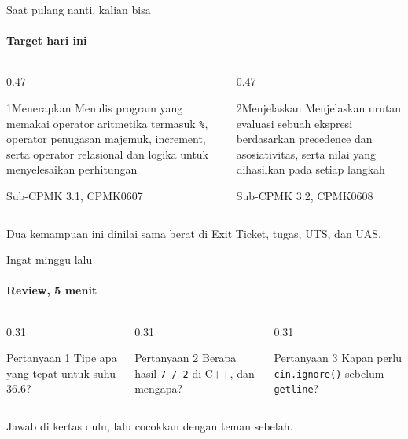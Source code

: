 \documentclass[t]{beamer}
\begin{document}
\begin{frame}{Saat pulang nanti, kalian bisa}
\framesubtitle{Target hari ini}
\begin{columns}[T]
\begin{column}{0.47\textwidth}
\begin{Langkah}{1}{Menerapkan}
Menulis program yang memakai operator aritmetika termasuk \texttt{\%}, operator penugasan majemuk, increment, serta operator relasional dan logika untuk menyelesaikan perhitungan

{\footnotesize\color{ITERAInkMuted}Sub-CPMK 3.1, CPMK0607}
\end{Langkah}
\end{column}
\begin{column}{0.47\textwidth}
\begin{Langkah}{2}{Menjelaskan}
Menjelaskan urutan evaluasi sebuah ekspresi berdasarkan precedence dan asosiativitas, serta nilai yang dihasilkan pada setiap langkah

{\footnotesize\color{ITERAInkMuted}Sub-CPMK 3.2, CPMK0608}
\end{Langkah}
\end{column}
\end{columns}
\vspace{8pt}
\begin{Catatan}
Dua kemampuan ini dinilai sama berat di Exit Ticket, tugas, UTS, dan UAS.
\end{Catatan}
\end{frame}

\begin{frame}{Ingat minggu lalu}
\framesubtitle{Review, 5 menit}
\begin{columns}[T]
\begin{column}{0.31\textwidth}
\begin{BlokGelap}{Pertanyaan 1}
Tipe apa yang tepat untuk suhu 36.6?
\end{BlokGelap}
\end{column}
\begin{column}{0.31\textwidth}
\begin{BlokGelap}{Pertanyaan 2}
Berapa hasil \texttt{7 / 2} di C++, dan mengapa?
\end{BlokGelap}
\end{column}
\begin{column}{0.31\textwidth}
\begin{BlokGelap}{Pertanyaan 3}
Kapan perlu \texttt{cin.ignore()} sebelum \texttt{getline}?
\end{BlokGelap}
\end{column}
\end{columns}
\vspace{8pt}
Jawab di kertas dulu, lalu cocokkan dengan teman sebelah.
\end{frame}
\end{document}
